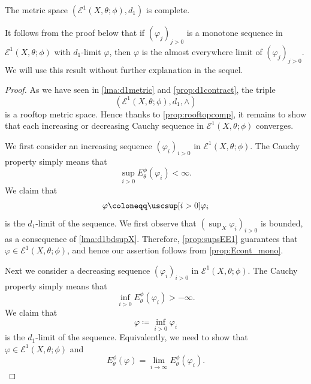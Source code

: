 \begin{theorem}\label{thm:d1_complete}
    The metric space $(\mathcal{E}^1(X,\theta;\phi),d_1)$ is complete.
\end{theorem}
It follows from the proof below that if $(\varphi_j)_{j>0}$ is a monotone sequence in $\mathcal{E}^1(X,\theta;\phi)$ with $d_1$-limit $\varphi$, then $\varphi$ is the almost everywhere limit of $(\varphi_j)_{j>0}$. We will use this result without further explanation in the sequel.
\begin{proof}
    As we have seen in \cref{lma:d1metric} and \cref{prop:d1contract}, the triple
    \[
    \left(\mathcal{E}^1(X,\theta;\phi),d_1,\land \right)
    \]
    is a rooftop metric space. Hence thanks to \cref{prop:rooftopcomp}, it remains to show that each increasing or decreasing Cauchy sequence in $\mathcal{E}^1(X,\theta;\phi)$ converges.

    We first consider an increasing sequence $(\varphi_i)_{i>0}$ in $\mathcal{E}^1(X,\theta;\phi)$. The Cauchy property simply means that
    \[
    \sup_{i>0} E_{\theta}^{\phi}(\varphi_i)<\infty.
    \]
    We claim that
    \[
    \varphi\coloneqq \uscsup[i>0]\varphi_i
    \]
    is the $d_1$-limit of the sequence. We first observe that $(\sup_X \varphi_i)_{i>0}$ is bounded, as a consequence of \cref{lma:d1bdsupX}. Therefore, \cref{prop:supsEE1} guarantees that $\varphi\in \mathcal{E}^1(X,\theta;\phi)$, and hence our assertion follows from \cref{prop:Econt_mono}.

    Next we consider a decreasing sequence $(\varphi_i)_{i>0}$ in $\mathcal{E}^1(X,\theta;\phi)$. The Cauchy property simply means that
    \[
    \inf_{i>0} E_{\theta}^{\phi}(\varphi_i)>-\infty.
    \]
    We claim that
    \[
     \varphi\coloneqq \inf_{i>0}\varphi_i
    \]
    is the $d_1$-limit of the sequence. Equivalently, we need to show that $\varphi\in \mathcal{E}^1(X,\theta;\phi)$ and
    \begin{equation}\label{eq:E_cont_decnet_temp1}
        E_{\theta}^{\phi}(\varphi)=\lim_{i\to\infty} E_{\theta}^{\phi}(\varphi_i).
    \end{equation}


\end{proof}

